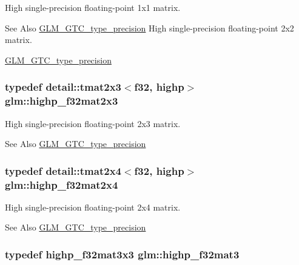 High single-\/precision floating-\/point 1x1 matrix. \begin{DoxySeeAlso}{See Also}
\hyperlink{group__gtc__type__precision}{G\-L\-M\-\_\-\-G\-T\-C\-\_\-type\-\_\-precision} High single-\/precision floating-\/point 2x2 matrix. 

\hyperlink{group__gtc__type__precision}{G\-L\-M\-\_\-\-G\-T\-C\-\_\-type\-\_\-precision} 
\end{DoxySeeAlso}
\hypertarget{group__gtc__type__precision_ga53613c1b93f81207065a8a935ff02a81}{
\subsubsection[{highp\-\_\-f32mat2x3}]{\setlength{\rightskip}{0pt plus 5cm}typedef detail\-::tmat2x3$<$f32, highp$>$ {\bf glm\-::highp\-\_\-f32mat2x3}}}\label{group__gtc__type__precision_ga53613c1b93f81207065a8a935ff02a81}
High single-\/precision floating-\/point 2x3 matrix. \begin{DoxySeeAlso}{See Also}
\hyperlink{group__gtc__type__precision}{G\-L\-M\-\_\-\-G\-T\-C\-\_\-type\-\_\-precision} 
\end{DoxySeeAlso}
\hypertarget{group__gtc__type__precision_ga9689dbe21bc976ca8069c63300b5887e}{
\subsubsection[{highp\-\_\-f32mat2x4}]{\setlength{\rightskip}{0pt plus 5cm}typedef detail\-::tmat2x4$<$f32, highp$>$ {\bf glm\-::highp\-\_\-f32mat2x4}}}\label{group__gtc__type__precision_ga9689dbe21bc976ca8069c63300b5887e}
High single-\/precision floating-\/point 2x4 matrix. \begin{DoxySeeAlso}{See Also}
\hyperlink{group__gtc__type__precision}{G\-L\-M\-\_\-\-G\-T\-C\-\_\-type\-\_\-precision} 
\end{DoxySeeAlso}
\hypertarget{group__gtc__type__precision_ga06809818db73785334f839742a9ad85a}{
\subsubsection[{highp\-\_\-f32mat3}]{\setlength{\rightskip}{0pt plus 5cm}typedef highp\-\_\-f32mat3x3 {\bf glm\-::highp\-\_\-f32mat3}}}\label{group__gtc__type__precision_ga06809818db73785334f839742a9ad85a}
